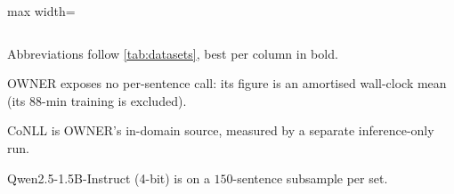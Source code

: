 \begin{table}[tp]
\begin{adjustbox}{max width=\textwidth}
\begin{threeparttable}
\begin{tabular}{l*{13}{c}c}
\bottomrule
\end{tabular}
\begin{tablenotes}[flushleft]
\footnotesize
\item Abbreviations follow \autoref{tab:datasets}, best per column in bold.
\item[$\S$] OWNER exposes no per-sentence call: its figure is an amortised wall-clock mean (its $88$-min training is excluded).
\item[$\dagger$] CoNLL is OWNER's in-domain source, measured by a separate inference-only run.
\item[$\ddagger$] Qwen2.5-1.5B-Instruct (4-bit) is on a $150$-sentence subsample per set.
\end{tablenotes}
\end{threeparttable}
\end{adjustbox}
\end{table}
